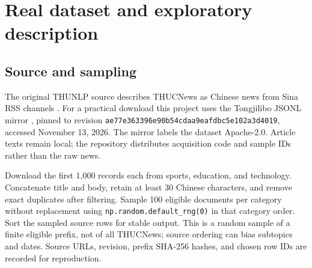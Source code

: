 \documentclass[11pt]{article}
\begin{document}
\section{Real dataset and exploratory description}
\subsection{Source and sampling}
The original THUNLP source describes THUCNews as Chinese news from Sina RSS
channels \cite{thuctc}. For a practical download this project uses the Tongjilibo
JSONL mirror \cite{mirror}, pinned to revision
\texttt{ae77e363396e90b54cdaa9eafdbc5e102a3d4019}, accessed November 13, 2026.
The mirror labels the dataset Apache-2.0. Article texts remain local; the
repository distributes acquisition code and sample IDs rather than the raw news.

Download the first 1,000 records each from sports, education, and technology.
Concatenate title and body, retain at least 30 Chinese characters, and remove
exact duplicates after filtering. Sample 100 eligible documents per category
without replacement using \texttt{np.random.default\_rng(0)} in that category order.
Sort the sampled source rows for stable output. This is a random sample of a
finite eligible prefix, not of all THUCNews; source ordering can bias subtopics
and dates. Source URLs, revision, prefix SHA-256 hashes, and chosen row IDs are
recorded for reproduction.
\end{document}
